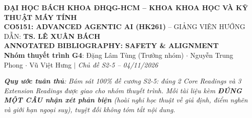 \documentclass[10pt,a4paper]{article}
\begin{document}

\begin{center}
  {\footnotesize \textbf{ĐẠI HỌC BÁCH KHOA ĐHQG-HCM -- KHOA KHOA HỌC VÀ KỸ THUẬT MÁY TÍNH}}\\[0.04cm]
  {\small \textbf{CO5151: ADVANCED AGENTIC AI (HK261)} -- GIẢNG VIÊN HƯỚNG DẪN: \textbf{TS. LÊ XUÂN BÁCH}}\\[0.12cm]
  {\large\bfseries\color{hcmutblue} ANNOTATED BIBLIOGRAPHY: SAFETY \& ALIGNMENT}\\[0.04cm]
  {\footnotesize \textbf{Nhóm thuyết trình G4}: Đặng Lâm Tùng (Trưởng nhóm) $\cdot$ Nguyễn Trung Phong $\cdot$ Vũ Việt Hưng $\vert$ \textit{Chủ đề S2-5 -- 04/11/2026}}
\end{center}

\vspace{-0.15cm}
\noindent\textit{\footnotesize \textbf{Quy ước tuân thủ}: Bám sát 100\% đề cương S2-5: đúng 2 Core Readings và 3 Extension Readings được giao cho nhóm thuyết trình. Mỗi tài liệu kèm \textbf{ĐÚNG MỘT CÂU nhận xét phản biện} (hoài nghi học thuật về giả định, điểm nghẽn và giới hạn ngoại suy), tuyệt đối không tóm tắt nội dung.}
\end{document}
